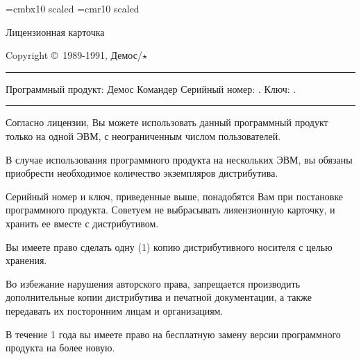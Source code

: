 \hsize=4in
\vsize=6in
\parindent=0pt
\parskip=4pt


\font\hugebf=cmbx10 scaled
\font\huge=cmr10 scaled

\nopagenumbers

\hugebf
\centerline{Лицензионная карточка}
\vskip 10pt
\bf
\centerline{Copyright \copyright\ 1989-1991, Демос/$\star$}

\vskip 20pt

\huge

\hrule
\vskip 10pt
Программный продукт: \space Демос Командер
\vskip 10pt
Серийный номер: {\leaders\hbox{\fiverm .}\hfill}
\vskip 10pt
Ключ: {\leaders\hbox{\fiverm .}\hfill}
\vskip 15pt
\hrule

\tenrm\it

\vskip 20pt

Согласно лицензии, Вы можете использовать данный программный продукт только
на одной ЭВМ, с неограниченным числом пользователей.

В случае использования программного продукта на нескольких ЭВМ,
вы обязаны приобрести необходимое количество экземпляров
дистрибутива.

Серийный номер и ключ, приведенные выше, понадобятся Вам при постановке
программного продукта.  Советуем не выбрасывать лияензионную карточку,
и хранить ее вместе с дистрибутивом.

Вы имеете право сделать одну (1) копию дистрибутивного носителя
с целью хранения.

Во избежание нарушения авторского права, запрещается
производить дополнительные копии дистрибутива и печатной документации,
а также передавать их посторонним лицам и организациям.

В течение 1 года вы имеете право на бесплатную замену версии
программного продукта на более новую.

